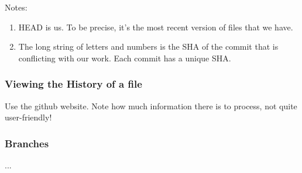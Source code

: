 \documentclass{beamer}
\begin{document}
\begin{frame}
Notes:
\begin{enumerate}
	\item HEAD is us. To be precise, it's the most recent version of files that we have.
	\item The long string of letters and numbers is the SHA of the commit that is conflicting with our work. Each commit has a unique SHA.
\end{enumerate}
\end{frame}

\begin{frame}
	\frametitle{Viewing the History of a file}
	Use the github website. Note how much information there is to process, not quite user-friendly!
\end{frame}

\begin{frame}
	\frametitle{Branches}
	...
\end{frame}




\end{document}
